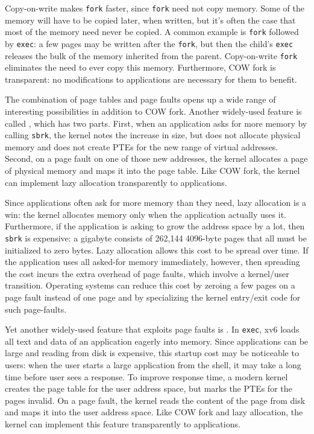 Copy-on-write makes \lstinline{fork} faster, since \lstinline{fork}
need not copy memory. Some of the memory will have to be copied
later, when written, but it's often the case that most of the
memory need never be copied.
A common example is
\lstinline{fork} followed by \lstinline{exec}:
a few pages may be written after the \lstinline{fork},
but then the child's \lstinline{exec} releases
the bulk of the memory inherited from the parent.
Copy-on-write \lstinline{fork} eliminates the need to
ever copy this memory.
Furthermore, COW fork is transparent:
no modifications to applications are necessary for
them to benefit.

The combination of page tables and page faults opens up a wide range
of interesting possibilities in addition to COW fork.  Another
widely-used feature is called , which has
two parts.  First, when an application asks for more memory by calling
\lstinline{sbrk}, the kernel notes the increase in size, but does not
allocate physical memory and does not create PTEs for the new range of
virtual addresses.  Second, on a page fault on one of those new
addresses, the kernel allocates a page of physical memory and maps it
into the page table.
Like COW fork,
the kernel can implement lazy allocation transparently to applications.

Since applications often ask for more memory than they need, lazy
allocation is a win: the kernel allocates memory only when the
application actually uses it.  Furthermore, if the application is
asking to grow the address space by a lot, then \lstinline{sbrk} is
expensive: a gigabyte consists of 262,144 4096-byte pages that all
must be initialized to zero bytes.  Lazy allocation allows this cost
to be spread over time.  If the application uses all asked-for memory
immediately, however, then spreading the cost incurs the extra
overhead of page faults, which involve a kernel/user transition.
Operating systems can reduce this cost by zeroing a few pages on a
page fault instead of one page and by specializing the kernel
entry/exit code for such page-faults.

Yet another widely-used feature that exploits page faults is
.  In \lstinline{exec}, xv6 loads all text
and data of an application eagerly into memory.  Since applications
can be large and reading from disk is expensive, this startup cost may
be noticeable to users: when the user starts a large application from
the shell, it may take a long time before user sees a response.  To
improve response time, a modern kernel creates the page table for the
user address space, but marks the PTEs for the pages invalid.  On a
page fault, the kernel reads the content of the page from disk and
maps it into the user address space.  Like COW fork and lazy
allocation, the kernel can implement this feature transparently to
applications.

